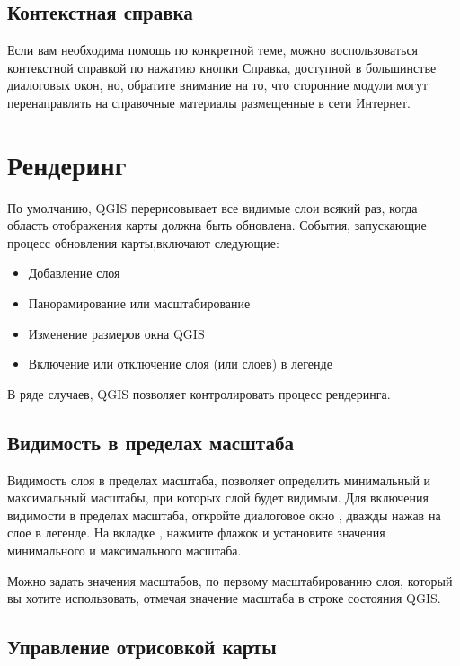 \subsection{Контекстная справка}\label{context_help}

Если вам необходима помощь по конкретной теме, можно воспользоваться контекстной справкой по нажатию кнопки Справка, доступной в большинстве диалоговых окон, но, обратите внимание на то, что сторонние модули могут перенаправлять на справочные материалы размещенные в сети Интернет.

\section{Рендеринг}\label{subsec:redraw_events}

По умолчанию, QGIS перерисовывает все видимые слои всякий раз, когда область отображения карты должна быть обновлена. События, запускающие процесс обновления карты,включают следующие:

\begin{itemize}
\item Добавление слоя
\item Панорамирование или масштабирование
\item Изменение размеров окна QGIS
\item Включение или отключение слоя (или слоев) в легенде
\end{itemize}

В ряде случаев, QGIS позволяет контролировать процесс рендеринга.

\subsection{Видимость в пределах масштаба}
\label{label_scaledepend}

Видимость слоя в пределах масштаба, позволяет определить минимальный и максимальный масштабы, при которых слой будет видимым. Для включения видимости в пределах масштаба, откройте диалоговое окно , дважды нажав на слое в легенде. На вкладке , нажмите флажок  и установите значения минимального и максимального масштаба.

Можно задать значения масштабов, по первому масштабированию слоя, который вы хотите использовать, отмечая значение масштаба в строке состояния QGIS.

\subsection{Управление отрисовкой карты}\label{label_controlmap}


